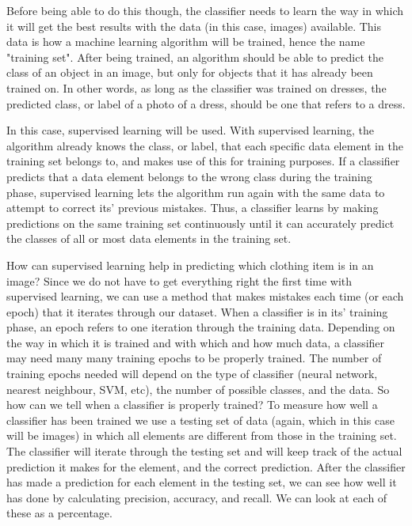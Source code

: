 \documentclass[12pt]{report} %
\begin{document}
	Before being able to do this though, the classifier needs to learn the way in which it will get the best results with the data (in this case, images) available. This data is how a machine learning algorithm will be trained, hence the name "training set". After being trained, an algorithm should be able to predict the class of an object in an image, but only for objects that it has already been trained on. In other words, as long as the classifier was trained on dresses, the predicted class, or label of a photo of a dress, should be one that refers to a dress. 
	
	In this case, supervised learning will be used. With supervised learning, the algorithm already knows the class, or label, that each specific data element in the training set belongs to, and makes use of this for training purposes. If a classifier predicts that a data element belongs to the wrong class during the training phase, supervised learning lets the algorithm run again with the same data to attempt to correct its' previous mistakes\cite{aurelienMachineLearning}. Thus, a classifier learns by making predictions on the same training set continuously until it can accurately predict the classes of all or most data elements in the training set. 
	
	How can supervised learning help in predicting which clothing item is in an image? Since we do not have to get everything right the first time with supervised learning, we can use a method that makes mistakes each time (or each epoch) that it iterates through our dataset. When a classifier is in its' training phase, an epoch refers to one iteration through the training data. Depending on the way in which it is trained and with which and how much data, a classifier may need many many training epochs to be properly trained. The number of training epochs needed will depend on the  type of classifier (neural network, nearest neighbour, SVM, etc), the number of possible classes, and the data. So how can we tell when a classifier is properly trained? 
	To measure how well a classifier has been trained we use a testing set of data (again, which in this case will be images) in which all elements are different from those in the training set. The classifier will iterate through the testing set and will keep track of the actual prediction it makes for the element, and the correct prediction. After the classifier has made a prediction for each element in the testing set, we can see how well it has done by calculating precision, accuracy, and recall. We can look at each of these as a percentage.
\end{document}
